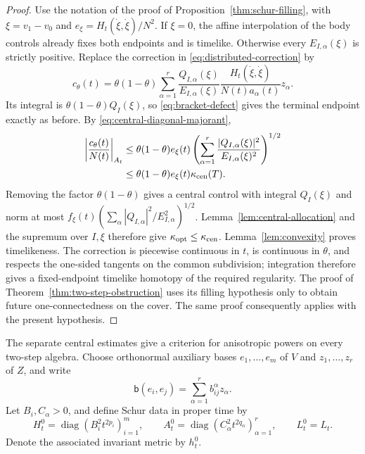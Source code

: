 \documentclass[10pt,a4paper]{article}
\numberwithin{equation}{section}
\theoremstyle{definition}
\theoremstyle{remark}
\begin{document}
\begin{proof}
Use the notation of the proof of Proposition~\ref{thm:schur-filling}, with
$\xi=v_1-v_0$ and $e_\xi=H_t(\dot\xi,\dot\xi)/N^2$.  If $\xi=0$,
the affine interpolation of the body controls already fixes both
endpoints and is timelike.  Otherwise every $E_{I,\alpha}(\xi)$ is
strictly positive.  Replace the correction in
\eqref{eq:distributed-correction} by
\begin{equation}
 c_\theta(t)=\theta(1-\theta)
 \sum_{\alpha=1}^r
  \frac{Q_{I,\alpha}(\xi)}{E_{I,\alpha}(\xi)}
  \frac{H_t(\dot\xi,\dot\xi)}{N(t)a_\alpha(t)}z_\alpha.
 \label{eq:componentwise-central-correction}
\end{equation}
Its integral is $\theta(1-\theta)Q_I(\xi)$, so
\eqref{eq:bracket-defect} gives the terminal endpoint exactly as before.
By \eqref{eq:central-diagonal-majorant},
\begin{align*}
 \left|\frac{c_\theta(t)}{N(t)}\right|_{A_t}
 &\le\theta(1-\theta)e_\xi(t)
 \left(\sum_{\alpha=1}^r
       \frac{|Q_{I,\alpha}(\xi)|^2}{E_{I,\alpha}(\xi)^2}
       \right)^{1/2}\\
 &\le\theta(1-\theta)e_\xi(t)\kappa_{\rm cen}(T).
\end{align*}
Removing the factor $\theta(1-\theta)$ gives a central control
with integral $Q_I(\xi)$ and norm at most
$f_\xi(t)(\sum_\alpha |Q_{I,\alpha}|^2/E_{I,\alpha}^2)^{1/2}$.
Lemma~\ref{lem:central-allocation} and the supremum over $I,\xi$
therefore give $\kappa_{\rm opt}\le\kappa_{\rm cen}$.
Lemma~\ref{lem:convexity} proves timelikeness.  The correction is
piecewise continuous in $t$, is continuous in $\theta$, and respects the
one-sided tangents on the common subdivision; integration therefore
gives a fixed-endpoint timelike homotopy of the required regularity.
The proof of Theorem~\ref{thm:two-step-obstruction} uses its filling
hypothesis only to obtain future one-connectedness on the cover.  The
same proof consequently applies with the present hypothesis.
\end{proof}

The separate central estimates give a criterion for anisotropic powers
on every two-step algebra.  Choose orthonormal auxiliary bases
$e_1,\ldots,e_m$ of $V$ and $z_1,\ldots,z_r$ of $Z$, and write
\[
 \mathsf b(e_i,e_j)=\sum_{\alpha=1}^r b_{ij}^{\alpha}z_\alpha.
\]
Let $B_i,C_\alpha>0$, and define Schur data in proper time by
\begin{equation}
 H_t^0=\operatorname{diag}(B_i^2t^{2p_i})_{i=1}^m,
 \qquad
 A_t^0=\operatorname{diag}(C_\alpha^2t^{2q_\alpha})_{\alpha=1}^r,
 \qquad L_t^0=L_t.
 \label{eq:fully-anisotropic-schur-powers}
\end{equation}
Denote the associated invariant metric by $h_t^0$.
\end{document}
